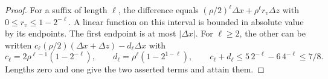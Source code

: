 \begin{proof}
For a suffix of length $\ell$, the difference equals
$(\rho/2)^\ell\Delta x+\rho^\ell r_v\Delta z$ with
$0\le r_v\le1-2^{-\ell}$. A linear function on this interval is
bounded in absolute value by its endpoints. The first endpoint is at
most $|\Delta x|$. For $\ell\ge2$, the other can be written
$c_\ell(\rho/2)(\Delta x+\Delta z)-d_\ell\Delta x$ with
\[
 c_\ell=2\rho^{\ell-1}(1-2^{-\ell}),\qquad
 d_\ell=\rho^\ell(1-2^{1-\ell}),\qquad
 c_\ell+d_\ell\le5\,2^{-\ell}-6\,4^{-\ell}\le7/8.
\]
Lengths zero and one give the two asserted terms and attain them.
\end{proof}
